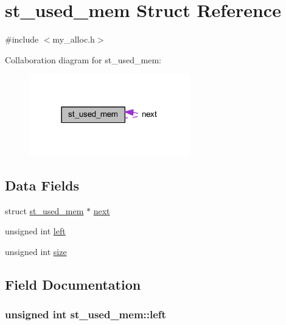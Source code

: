 \hypertarget{structst__used__mem}{}\section{st\+\_\+used\+\_\+mem Struct Reference}
\label{structst__used__mem}


{\ttfamily \#include $<$my\+\_\+alloc.\+h$>$}



Collaboration diagram for st\+\_\+used\+\_\+mem\+:\nopagebreak
\begin{figure}[H]
\begin{center}
\leavevmode
\includegraphics[width=198pt]{structst__used__mem__coll__graph}
\end{center}
\end{figure}
\subsection*{Data Fields}
\begin{DoxyCompactItemize}
\item 
struct \hyperlink{structst__used__mem}{st\+\_\+used\+\_\+mem} $\ast$ \hyperlink{structst__used__mem_af0d44c8373329563afc30a14acc810b4}{next}
\item 
unsigned int \hyperlink{structst__used__mem_ac11095c69589cce049d735d036c638f5}{left}
\item 
unsigned int \hyperlink{structst__used__mem_ab8fe1a337ad5024c34bd7b26400ce96e}{size}
\end{DoxyCompactItemize}


\subsection{Field Documentation}
\hypertarget{structst__used__mem_ac11095c69589cce049d735d036c638f5}{}
\subsubsection[{left}]{\setlength{\rightskip}{0pt plus 5cm}unsigned int st\+\_\+used\+\_\+mem\+::left}\label{structst__used__mem_ac11095c69589cce049d735d036c638f5}
\hypertarget{structst__used__mem_af0d44c8373329563afc30a14acc810b4}{}
